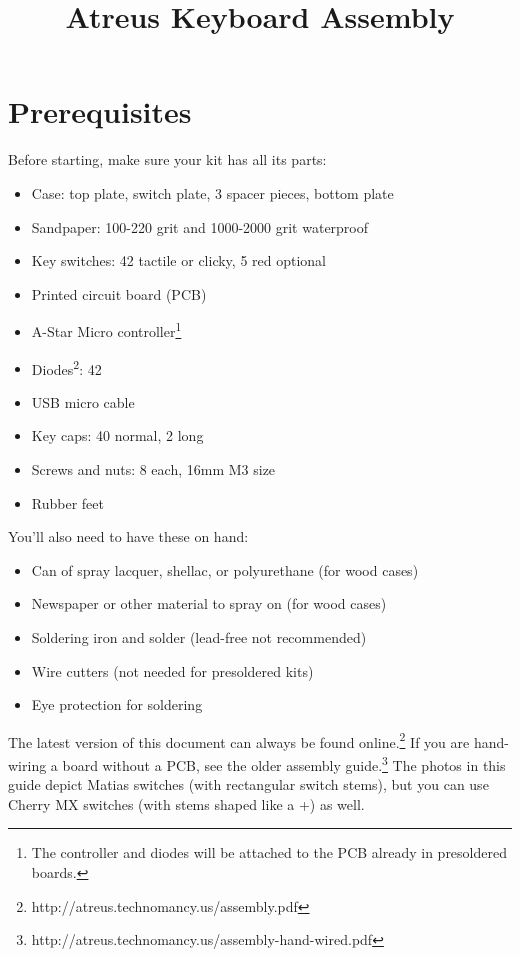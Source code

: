 \documentclass[landscape,twocolumn]{article}
\title{Atreus Keyboard Assembly}
\date{ }
\begin{document}
\setlength{\columnsep}{1.4cm}
\setlength{\parindent}{0cm}
\maketitle
\section{Prerequisites}

Before starting, make sure your kit has all its parts:

\begin{itemize}
\item Case: top plate, switch plate, 3 spacer pieces, bottom plate
\item Sandpaper: 100-220 grit and 1000-2000 grit waterproof
\item Key switches: 42 tactile or clicky, 5 red optional
\item Printed circuit board (PCB)
\item A-Star Micro controller\footnote{The controller and diodes will be
  attached to the PCB already in presoldered boards.}
\item Diodes\textsuperscript{2}: 42
\item USB micro cable
\item Key caps: 40 normal, 2 long
\item Screws and nuts: 8 each, 16mm M3 size
\item Rubber feet
\end{itemize}

You'll also need to have these on hand:

\begin{itemize}
\item Can of spray lacquer, shellac, or polyurethane (for wood cases)
\item Newspaper or other material to spray on (for wood cases)
\item Soldering iron and solder (lead-free not recommended)
\item Wire cutters (not needed for presoldered kits)
\item Eye protection for soldering
\end{itemize}

\vspace{1em}

The latest version of this document can always be found
online.\footnote{http://atreus.technomancy.us/assembly.pdf} If you are
hand-wiring a board without a PCB, see the older assembly
guide.\footnote{http://atreus.technomancy.us/assembly-hand-wired.pdf}
The photos in this guide depict Matias switches (with rectangular
switch stems), but you can use Cherry MX switches (with stems shaped
like a +) as well.
\end{document}

